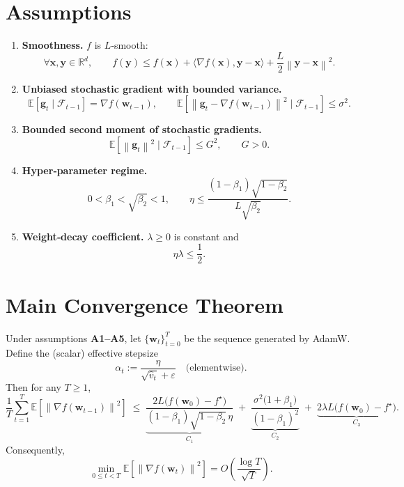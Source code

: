 \documentclass{article}
\newcommand{\E}{\mathbb{E}}
\newcommand{\norm}[1]{\left\|#1\right\|}
\begin{document}
\newpage
\section*{Assumptions}
\begin{enumerate}[label={A\arabic*}.]
\item \textbf{Smoothness.} $f$ is $L$‑smooth:
\[
    \forall \bm x,\bm y\in\mathbb{R}^{d},\qquad 
    f(\bm y)\le f(\bm x)+\langle\nabla f(\bm x),\bm y-\bm x\rangle+\frac{L}{2}\norm{\bm y-\bm x}^{2}.
\tag{A1}
\]
\item \textbf{Unbiased stochastic gradient with bounded variance.}
\[
    \E[\bm g_t\mid \mathcal{F}_{t-1}]=\nabla f(\bm w_{t-1}),\qquad
    \E\!\left[\norm{\bm g_t-\nabla f(\bm w_{t-1})}^{2}\mid \mathcal{F}_{t-1}\right]\le\sigma^{2}. \tag{A2}
\]
\item \textbf{Bounded second moment of stochastic gradients.}
\[
    \E\!\left[\norm{\bm g_t}^{2}\mid \mathcal{F}_{t-1}\right]\le G^{2},\qquad G>0. \tag{A3}
\]
\item \textbf{Hyper‑parameter regime.}
\[
    0<\beta_{1}<\sqrt{\beta_{2}}<1,\qquad 
    \eta\le \frac{(1-\beta_{1})\sqrt{1-\beta_{2}}}{L\sqrt{\beta_{2}}}.
    \tag{A4}
\]
\item \textbf{Weight‑decay coefficient.} $\lambda\ge 0$ is constant and
\[
    \eta\lambda \le \frac{1}{2}. \tag{A5}
\]
\end{enumerate}

\section*{Main Convergence Theorem}
\begin{theorem}\label{thm:adamw}
Under assumptions \textbf{A1–A5}, let $\{\bm w_t\}_{t=0}^{T}$ be the sequence generated by AdamW. Define the (scalar) effective stepsize
\[
    \alpha_t:=\frac{\eta}{\sqrt{\hat{v}_{t}}+\varepsilon}\quad\text{(elementwise)}.
\]
Then for any $T\ge 1$,
\[
    \frac{1}{T}\sum_{t=1}^{T}\E\!\left[\norm{\nabla f(\bm w_{t-1})}^{2}\right]
    \;\le\;
    \underbrace{\frac{2L\bigl(f(\bm w_{0})-f^{\star}\bigr)}{(1-\beta_{1})\sqrt{1-\beta_{2}}\,\eta}}_{C_{1}}
    \;+\;
    \underbrace{\frac{\sigma^{2}\bigl(1+\beta_{1}\bigr)}{(1-\beta_{1})^{2}}}_{C_{2}}
    \;+\;
    \underbrace{2\lambda L\bigl(f(\bm w_{0})-f^{\star}\bigr)}_{C_{3}} .
\tag{6}
\]
Consequently,
\[
    \min_{0\le t<T}\E\!\left[\norm{\nabla f(\bm w_{t})}^{2}\right]
    = O\!\left(\frac{\log T}{\sqrt{T}}\right).
\]
\end{theorem}
\end{document}

